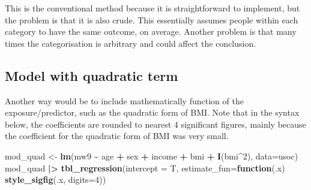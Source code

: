 \documentclass[
]{book}
\newenvironment{Shaded}{\begin{snugshade}}{\end{snugshade}}
\newcommand{\AttributeTok}[1]{\textcolor[rgb]{0.13,0.29,0.53}{#1}}
\newcommand{\ControlFlowTok}[1]{\textcolor[rgb]{0.13,0.29,0.53}{\textbf{#1}}}
\newcommand{\DecValTok}[1]{\textcolor[rgb]{0.00,0.00,0.81}{#1}}
\newcommand{\FunctionTok}[1]{\textcolor[rgb]{0.13,0.29,0.53}{\textbf{#1}}}
\newcommand{\NormalTok}[1]{#1}
\newcommand{\OtherTok}[1]{\textcolor[rgb]{0.56,0.35,0.01}{#1}}
\newcommand{\SpecialCharTok}[1]{\textcolor[rgb]{0.81,0.36,0.00}{\textbf{#1}}}
\begin{document}
This is the conventional method because it is straightforward to implement, but the problem is that it is also crude. This essentially assumes people within each category to have the same outcome, on average. Another problem is that many times the categorisation is arbitrary and could affect the conclusion.

\subsection{Model with quadratic term}\label{model-with-quadratic-term}

Another way would be to include mathematically function of the exposure/predictor, such as the quadratic form of BMI. Note that in the syntax below, the coefficients are rounded to nearest 4 significant figures, mainly because the coefficient for the quadratic form of BMI was very small.

\begin{Shaded}
\begin{Highlighting}[]
\NormalTok{mod\_quad }\OtherTok{\textless{}{-}} \FunctionTok{lm}\NormalTok{(mw9 }\SpecialCharTok{\textasciitilde{}}\NormalTok{ age }\SpecialCharTok{+}\NormalTok{ sex }\SpecialCharTok{+}\NormalTok{ income }\SpecialCharTok{+}\NormalTok{ bmi }\SpecialCharTok{+} \FunctionTok{I}\NormalTok{(bmi}\SpecialCharTok{\^{}}\DecValTok{2}\NormalTok{), }\AttributeTok{data=}\NormalTok{usoc)}
\NormalTok{mod\_quad }\SpecialCharTok{|\textgreater{}} \FunctionTok{tbl\_regression}\NormalTok{(}\AttributeTok{intercept =}\NormalTok{ T, }\AttributeTok{estimate\_fun=}\ControlFlowTok{function}\NormalTok{(.x) }\FunctionTok{style\_sigfig}\NormalTok{(.x, }\AttributeTok{digits=}\DecValTok{4}\NormalTok{))}
\end{Highlighting}
\end{Shaded}
\end{document}
